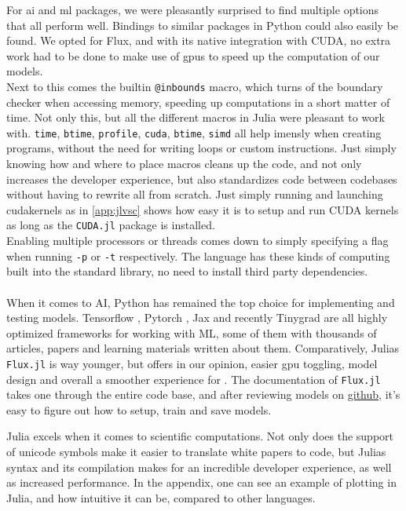  For \acrshort{ai} and \acrshort{ml} packages, we were pleasantly surprised to find multiple options that all perform well. Bindings to similar packages in Python could also easily be found. We opted for Flux, and with its native integration with CUDA, no extra work had to be done to make use of \acrshort{gpu}s to speed up the computation of our models. \\

Next to this comes the builtin \texttt{@inbounds} macro, which turns of the boundary checker when accessing memory, speeding up computations in a short matter of time. Not only this, but all the different macros in Julia were pleasant to work with. \texttt{time}, \texttt{btime}, \texttt{profile}, \texttt{cuda}, \texttt{btime}, \texttt{simd} all help imensly when creating programs, without the need for writing loops or custom instructions. Just simply knowing how and where to place macros cleans up the code, and not only increases the developer experience, but also standardizes code between codebases without having to rewrite all from scratch. Just simply running and launching cudakernels as in \ref{app:jlvsc} shows how easy it is to setup and run CUDA kernels as long as the \texttt{CUDA.jl} package is installed. \\

Enabling multiple processors or threads comes down to simply specifying a flag when running \texttt{-p} or \texttt{-t} respectively. The language has these kinds of computing built into the standard library, no need to install third party dependencies. \\ \\

When it comes to AI, Python has remained the top choice for implementing and testing models. Tensorflow \cite{abadi2016tensorflow}, Pytorch \cite{paszke2019pytorch}, Jax \cite{47008} and recently Tinygrad \cite{tinygrad} are all highly optimized frameworks for working with ML, some of them with thousands of articles, papers and learning materials written about them. Comparatively, Julias \texttt{Flux.jl} is way younger, but offers in our opinion, easier \acrshort{gpu} toggling, model design and overall a smoother experience for . The documentation of \texttt{Flux.jl} takes one through the entire code base, and after reviewing models on \href{https://github.com/FluxML/model-zoo}{github}, it's easy to figure out how to setup, train and save models.

Julia excels when it comes to scientific computations. Not only does the support of unicode symbols make it easier to translate white papers to code, but Julias syntax and its compilation makes for an incredible developer experience, as well as increased performance. In the appendix, one can see an example of plotting in Julia, and how intuitive it can be, compared to other languages. \\
 
